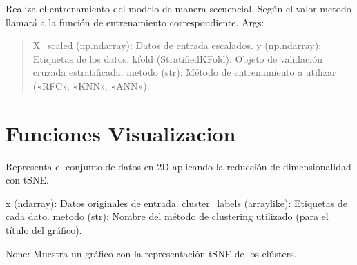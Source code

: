 \documentclass[letterpaper,10pt,spanish]{sphinxmanual}
\begin{document}
\begin{fulllineitems}
\label{\detokenize{Reduccion_Dimension:Seleccion_ejecucion.single}}
\pysigstartsignatures
\pysiglinewithargsret
{}
{\sphinxparamcomma {}\sphinxparamcomma {}\sphinxparamcomma {}}
{}
\pysigstopsignatures
\sphinxAtStartPar
Realiza el entrenamiento del modelo de manera secuencial.
Según el valor metodo llamará a la función de entrenamiento correspondiente.
Args:
\begin{quote}

\sphinxAtStartPar
X\_scaled (np.ndarray): Datos de entrada escalados.
y (np.ndarray): Etiquetas de los datos.
kfold (StratifiedKFold): Objeto de validación cruzada estratificada.
metodo (str): Método de entrenamiento a utilizar («RFC», «KNN», «ANN»).
\end{quote}

\end{fulllineitems}


\sphinxstepscope


\chapter{Funciones Visualizacion}
\label{\detokenize{Funciones_Visualizacion:module-tsne}}\label{\detokenize{Funciones_Visualizacion:funciones-visualizacion}}\label{\detokenize{Funciones_Visualizacion::doc}}

\begin{fulllineitems}
\label{\detokenize{Funciones_Visualizacion:tsne.tsne}}
\pysigstartsignatures
\pysiglinewithargsret
{}
{\sphinxparamcomma {}\sphinxparamcomma {}}
{}
\pysigstopsignatures
\sphinxAtStartPar
Representa el conjunto de datos en 2D aplicando la reducción de dimensionalidad con t\sphinxhyphen{}SNE.
\begin{description}
\sphinxAtStartPar
x (ndarray): Datos originales de entrada.
cluster\_labels (array\sphinxhyphen{}like): Etiquetas de cada dato.
metodo (str): Nombre del método de clustering utilizado (para el título del gráfico).

\sphinxAtStartPar
None: Muestra un gráfico con la representación t\sphinxhyphen{}SNE de los clústers.

\end{description}

\end{fulllineitems}
\end{document}
